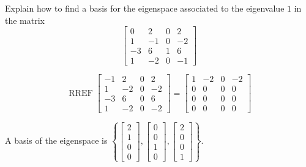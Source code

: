 
\begin{exerciseStatement}


Explain how to find a basis for the eigenspace associated to the eigenvalue \( 1 \) in the matrix \[ \left[\begin{array}{cccc}
0 & 2 & 0 & 2 \\
1 & -1 & 0 & -2 \\
-3 & 6 & 1 & 6 \\
1 & -2 & 0 & -1
\end{array}\right] \]


\end{exerciseStatement}
    
\begin{exerciseAnswer} 


\[\operatorname{RREF} \left[\begin{array}{cccc}
-1 & 2 & 0 & 2 \\
1 & -2 & 0 & -2 \\
-3 & 6 & 0 & 6 \\
1 & -2 & 0 & -2
\end{array}\right] = \left[\begin{array}{cccc}
1 & -2 & 0 & -2 \\
0 & 0 & 0 & 0 \\
0 & 0 & 0 & 0 \\
0 & 0 & 0 & 0
\end{array}\right] \]



A basis of the eigenspace is \( \left\{ \left[\begin{array}{c}
2 \\
1 \\
0 \\
0
\end{array}\right] , \left[\begin{array}{c}
0 \\
0 \\
1 \\
0
\end{array}\right] , \left[\begin{array}{c}
2 \\
0 \\
0 \\
1
\end{array}\right] \right\} \).


\end{exerciseAnswer}
    
